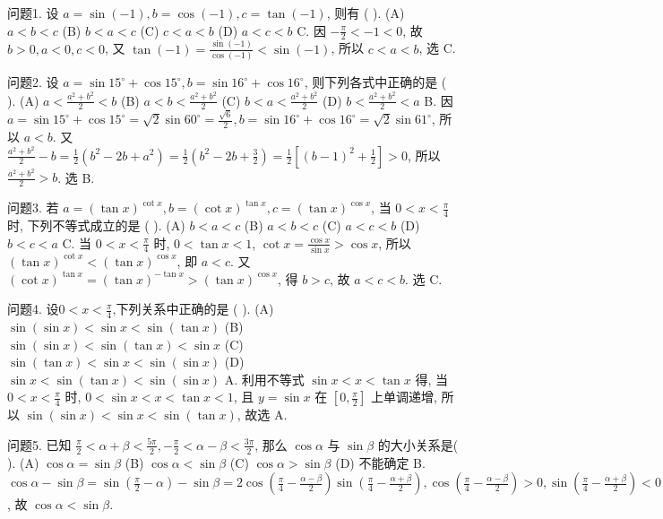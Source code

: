 
问题1. 设 $a=\sin (-1), b=\cos (-1), c=\tan (-1)$, 则有 ( ).
(A) $a<b<c$
(B) $b<a<c$
(C) $c<a<b$
(D) $a<c<b$
C. 因 $-\frac{\pi}{2}<-1<0$, 故 $b>0, a<0, c<0$, 又 $\tan (-1)=\frac{\sin (-1)}{\cos (-1)}< \sin (-1)$, 所以 $c<a<b$, 选 C.



问题2. 设 $a=\sin 15^{\circ}+\cos 15^{\circ}, b=\sin 16^{\circ}+\cos 16^{\circ}$, 则下列各式中正确的是 ( ).
(A) $a<\frac{a^2+b^2}{2}<b$
(B) $a<b<\frac{a^2+b^2}{2}$
(C) $b<a<\frac{a^2+b^2}{2}$
(D) $b<\frac{a^2+b^2}{2}<a$
B. 因 $a=\sin 15^{\circ}+\cos 15^{\circ}=\sqrt{2} \sin 60^{\circ}=\frac{\sqrt{6}}{2}, b=\sin 16^{\circ}+\cos 16^{\circ}= \sqrt{2} \sin 61^{\circ}$, 所以 $a<b$. 又 $\frac{a^2+b^2}{2}-b=\frac{1}{2}\left(b^2-2 b+a^2\right)=\frac{1}{2}\left(b^2-2 b+\frac{3}{2}\right)= \frac{1}{2}\left[(b-1)^2+\frac{1}{2}\right]>0$, 所以 $\frac{a^2+b^2}{2}>b$. 选 B.



问题3. 若 $a=(\tan x)^{\cot x}, b=(\cot x)^{\tan x}, c=(\tan x)^{\cos x}$, 当 $0<x<\frac{\pi}{4}$ 时, 下列不等式成立的是 ( ).
(A) $b<a<c$
(B) $a<b<c$
(C) $a<c<b$
(D) $b<c<a$
C. 当 $0<x<\frac{\pi}{4}$ 时, $0<\tan x<1$, $\cot x=\frac{\cos x}{\sin x}>\cos x$, 所以 $(\tan x)^{\cot x}<(\tan x)^{\cos x}$, 即 $a<c$. 又 $(\cot x)^{\tan x}=(\tan x)^{-\tan x}>(\tan x)^{\cos x}$, 得 $b>c$, 故 $a<c<b$. 选 C.



问题4. 设$0 < x < \frac{\pi}{4}$,下列关系中正确的是 ( ).
(A) $\sin (\sin x)<\sin x<\sin (\tan x)$
(B) $\sin (\sin x)<\sin (\tan x)<\sin x$
(C) $\sin (\tan x)<\sin x<\sin (\sin x)$
(D) $\sin x<\sin (\tan x)<\sin (\sin x)$
A. 利用不等式 $\sin x<x<\tan x$ 得, 当 $0<x<\frac{\pi}{4}$ 时, $0<\sin x< x<\tan x<1$, 且 $y=\sin x$ 在 $\left[0, \frac{\pi}{2}\right]$ 上单调递增, 所以 $\sin (\sin x)<\sin x< \sin (\tan x)$, 故选 A.



问题5. 已知 $\frac{\pi}{2}<\alpha+\beta<\frac{5 \pi}{2},-\frac{\pi}{2}<\alpha-\beta<\frac{3 \pi}{2}$, 那么 $\cos \alpha$ 与 $\sin \beta$ 的大小关系是( ).
(A) $\cos \alpha=\sin \beta$
(B) $\cos \alpha<\sin \beta$
(C) $\cos \alpha>\sin \beta$
(D) 不能确定
B. $\cos \alpha-\sin \beta=\sin \left(\frac{\pi}{2}-\alpha\right)-\sin \beta=2 \cos \left(\frac{\pi}{4}-\frac{\alpha-\beta}{2}\right) \sin \left(\frac{\pi}{4}-\right. \left.\frac{\alpha+\beta}{2}\right), \cos \left(\frac{\pi}{4}-\frac{\alpha-\beta}{2}\right)>0, \sin \left(\frac{\pi}{4}-\frac{\alpha+\beta}{2}\right)<0$, 故 $\cos \alpha<\sin \beta$.



